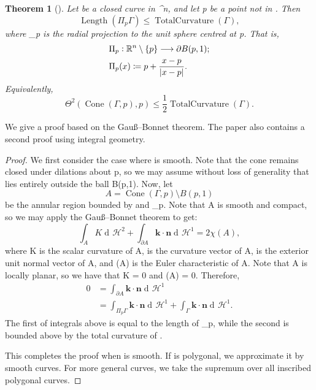 \documentclass[a4paper, 11pt]{article}
\theoremstyle{plain}
\newtheorem{theorem}{Theorem}[section]
\theoremstyle{definition}
\theoremstyle{remark}
\DeclareMathOperator{\diff}{d \!}
\numberwithin{equation}{subsection}
\def\({}
\def\){}
\def\pi{}
\begin{document}
\begin{theorem}[{\cite[Theorem 1.1]{EWW02}}]
\label{Interior_Regularity_2}
Let \(\Gamma\) be a closed curve in \(^{n}\), and let \(p\) be a point not in \(\Gamma\). Then
\begin{equation}
\operatorname{Length}(\Pi_{p}\Gamma) \leqslant \operatorname{TotalCurvature}(\Gamma),
\end{equation}
where \(\Pi_{p}\) is the radial projection to the unit sphere centred at \(p\). That is,
\begin{align*}
&\Pi_{p} \vcentcolon \mathbb{R}^{n} \setminus \{p\} \longrightarrow \partial B(p,1); \\
&\Pi_{p}(x) \coloneq p + \frac{x-p}{|x-p|}.
\end{align*}
Equivalently,
\begin{equation}
\Theta^{2}(\operatorname{Cone}(\Gamma, p), p) \leqslant \frac{1}{2\pi}\operatorname{TotalCurvature}(\Gamma).
\end{equation}
\end{theorem}
We give a proof based on the Gau\ss --Bonnet theorem. The paper also contains a second proof using integral geometry.

\begin{proof}
We first consider the case where \(\Gamma\) is smooth. Note that the cone remains closed under dilations about \(p\), so we may assume without loss of generality that \(\Gamma\) lies entirely outside the ball \(B(p,1)\). Now, let
\begin{equation}
A = \operatorname{Cone}(\Gamma, p) \setminus B(p,1)
\end{equation}
be the annular region bounded by \(\Gamma\) and \(\Pi_{p}\Gamma\). Note that \(A\) is smooth and compact, so we may apply the Gau\ss--Bonnet theorem to get:
\begin{equation}
\int_{A}K \diff\mathcal{H}^{2} + \int_{\partial A} \mathbf{k} \cdot \mathbf{n} \diff \mathcal{H}^{1} = 2\pi\chi(A),
\end{equation}
where \(K\) is the scalar curvature of \(A\), \(\) is the curvature vector of \(\partial A\), \(\) is the exterior unit normal vector of \(A\), and \(\chi(A)\) is the Euler characteristic of \(A\). Note that \(A\) is locally planar, so we have that \(K = 0\) and \(\chi(A) = 0\). Therefore,
\begin{align*}
0 &= \int_{\partial A} \mathbf{k} \cdot \mathbf{n} \diff \mathcal{H}^{1} \\
&= \int_{\Pi_{p}\Gamma} \mathbf{k} \cdot \mathbf{n} \diff \mathcal{H}^{1} + \int_{\Gamma} \mathbf{k} \cdot \mathbf{n} \diff \mathcal{H}^{1}. 
\end{align*}
The first of integrals above is equal to the length of \(\Pi_{p}\Gamma\), while the second is bounded above by the total curvature of \(\Gamma\). 

This completes the proof when \(\Gamma\) is smooth. If \(\Gamma\) is polygonal, we approximate it by smooth curves. For more general curves, we take the supremum over all inscribed polygonal curves.
\end{proof}
\end{document}
